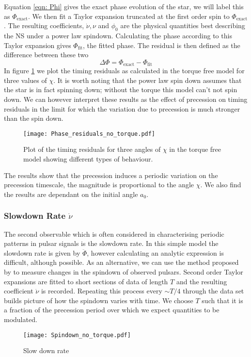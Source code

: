\documentclass[/home/greg/Thesis/main/main.tex]{subfiles}
\begin{document}
Equation \eqref{eqn: Phi} gives the exact phase evolution of the star, we will
label this as $\Phi_{\textrm{exact}}$. We then fit a Taylor expansion truncated
at the first order spin to $\Phi_{\textrm{exact}}$. The resulting coefficients,
$\dot{\nu}, \nu$ and $\phi_{0}$ are the physical quantities best describing the
NS under a power law spindown. Calculating the phase according to this Taylor
expansion gives $\Phi_{\textrm{fit}}$, the fitted phase. The residual is then
defined as the difference between these two
\begin{equation}
  \Delta\Phi = \Phi_{\textrm{exact}} - \Phi_{\textrm{fit}}
\end{equation}
In figure \ref{fig: TR no torque} we plot the timing residuals as calculated in
the torque free model for three values of $\chi$. It is worth noting that the
power law spin down assumes that the star is in fact spinning down; without the
torque this model can't not spin down. We can however interpret these results
as the effect of precession on timing residuals in the limit for which the
variation due to precession is much stronger than the spin down.
\begin{figure}[ht]
\centering
	\texttt{[image: Phase\_residuals\_no\_torque.pdf]}
\caption{Plot of the timing residuals for three angles of $\chi$ in the torque
         free model showing different types of behaviour. }
\label{fig: TR no torque}
\end{figure}
The results show that the precession induces a periodic variation on the
precession timescale, the magnitude is proportional to the angle $\chi$. We 
also find the results are dependant on the initial angle $a_{0}$.

\subsubsection{Slowdown Rate $\dot{\nu}$}

The second observable which is often considered in characterising periodic
patterns in pulsar signals is the slowdown rate. In this simple model the
slowdown rate is given by $\ddot{\Phi}$, however calculating an analytic
expression is difficult, although possible. As an alternative, we
can use the method proposed by \citet{Lyne2010} to measure changes in the
spindown of observed pulsars. Second order Taylor expansions are fitted to
short sections of data of length $T$ and the resulting coefficient $\dot{\nu}$
is recorded. Repeating this process every $\sim T/4$ through the data set
builds picture of how the spindown varies with time. We choose $T$ such that it
is a fraction of the precession period over which we expect quantities to be
modulated.
\begin{figure}[ht]
\centering
	\texttt{[image: Spindown\_no\_torque.pdf]}
\caption{Slow down rate }
\label{fig: nu_dot no torque}
\end{figure}
\end{document}
